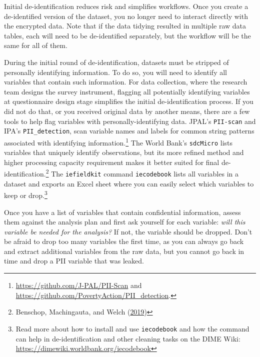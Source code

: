 \documentclass[
]{book}
\begin{document}
Initial de-identification reduces risk and simplifies workflows.
Once you create a de-identified version of the dataset,
you no longer need to interact directly with the encrypted data.
Note that if the data tidying resulted in multiple raw data tables,
each will need to be de-identified separately, but
the workflow will be the same for all of them.

During the initial round of de-identification,
datasets must be stripped of personally identifying information.
To do so, you will need to identify all variables that contain such information.
For data collection, where the research team designs the survey instrument,
flagging all potentially identifying variables at questionnaire design stage
simplifies the initial de-identification process.
If you did not do that, or you received original data by another means,
there are a few tools to help flag variables with personally-identifying data.
JPAL's \texttt{PII-scan} and
IPA's \texttt{PII\_detection},
scan variable names and labels for common string patterns
associated with identifying information.\footnote{\url{https://github.com/J-PAL/PII-Scan} and
  \url{https://github.com/PovertyAction/PII_detection}.}
The World Bank's \texttt{sdcMicro}
lists variables that uniquely identify observations,
but its more refined method and
higher processing capacity requirement makes it
better suited for final de-identification.\footnote{Benschop, Machingauta, and Welch (\protect\hyperlink{ref-benschop2019statistical}{2019})}
The \texttt{iefieldkit} command \texttt{iecodebook}
lists all variables in a dataset and exports an Excel sheet
where you can easily select which variables to keep or drop.\footnote{Read more about how to install and use \texttt{iecodebook} and
  how the command can help in de-identification and other cleaning tasks
  on the DIME Wiki:
  \url{https://dimewiki.worldbank.org/iecodebook}}

Once you have a list of variables that contain confidential information,
assess them against the analysis plan and first ask yourself for each variable:
\emph{will this variable be needed for the analysis?}
If not, the variable should be dropped.
Don't be afraid to drop too many variables the first time,
as you can always go back and extract additional variables from the raw data,
but you cannot go back in time and drop a PII variable that was leaked.
\end{document}
